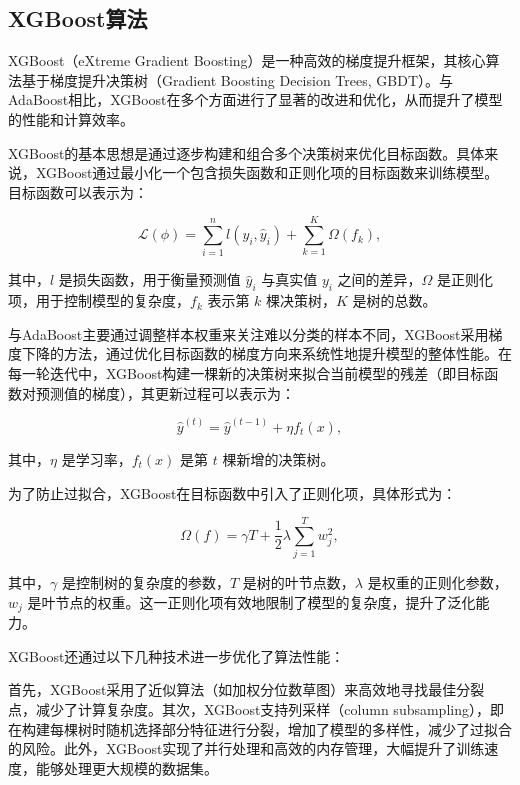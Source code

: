 \documentclass[a4paper,11pt,AutoFakeBold]{ctexart}
\begin{document}
\subsection{XGBoost算法}

XGBoost（eXtreme Gradient Boosting）是一种高效的梯度提升框架，其核心算法基于梯度提升决策树（Gradient Boosting Decision Trees, GBDT）。与AdaBoost相比，XGBoost在多个方面进行了显著的改进和优化，从而提升了模型的性能和计算效率。

XGBoost的基本思想是通过逐步构建和组合多个决策树来优化目标函数。具体来说，XGBoost通过最小化一个包含损失函数和正则化项的目标函数来训练模型。目标函数可以表示为：

\begin{equation}
\mathcal{L}(\phi) = \sum_{i=1}^n l(y_i, \hat{y}_i) + \sum_{k=1}^K \Omega(f_k),
\end{equation}

其中，$l$ 是损失函数，用于衡量预测值 $\hat{y}_i$ 与真实值 $y_i$ 之间的差异，$\Omega$ 是正则化项，用于控制模型的复杂度，$f_k$ 表示第 $k$ 棵决策树，$K$ 是树的总数。

与AdaBoost主要通过调整样本权重来关注难以分类的样本不同，XGBoost采用梯度下降的方法，通过优化目标函数的梯度方向来系统性地提升模型的整体性能。在每一轮迭代中，XGBoost构建一棵新的决策树来拟合当前模型的残差（即目标函数对预测值的梯度），其更新过程可以表示为：

\begin{equation}
\hat{y}^{(t)} = \hat{y}^{(t-1)} + \eta f_t(x),
\end{equation}

其中，$\eta$ 是学习率，$f_t(x)$ 是第 $t$ 棵新增的决策树。

为了防止过拟合，XGBoost在目标函数中引入了正则化项，具体形式为：

\begin{equation}
\Omega(f) = \gamma T + \frac{1}{2} \lambda \sum_{j=1}^T w_j^2,
\end{equation}

其中，$\gamma$ 是控制树的复杂度的参数，$T$ 是树的叶节点数，$\lambda$ 是权重的正则化参数，$w_j$ 是叶节点的权重。这一正则化项有效地限制了模型的复杂度，提升了泛化能力。

XGBoost还通过以下几种技术进一步优化了算法性能：

首先，XGBoost采用了近似算法（如加权分位数草图）来高效地寻找最佳分裂点，减少了计算复杂度。其次，XGBoost支持列采样（column subsampling），即在构建每棵树时随机选择部分特征进行分裂，增加了模型的多样性，减少了过拟合的风险。此外，XGBoost实现了并行处理和高效的内存管理，大幅提升了训练速度，能够处理更大规模的数据集。
\end{document}
